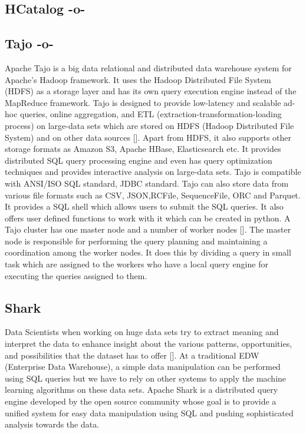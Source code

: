 \subsection{HCatalog -o-}



\subsection{Tajo -o-}

Apache Tajo is a big data relational and distributed data warehouse
system for Apache's Hadoop framework\cite{www-apache-tajo}. It uses
the Hadoop Distributed File System (HDFS) as a storage layer and has
its own query execution engine instead of the MapReduce
framework. Tajo is designed to provide low-latency and scalable ad-hoc
queries, online aggregation, and ETL
(extraction-transformation-loading process) on large-data sets which
are stored on HDFS (Hadoop Distributed File System) and on other data
sources [\cite{www-tutorialspoint-tajo}]. Apart from HDFS, it also
supports other storage formats as Amazon S3, Apache HBase,
Elasticsearch etc. It provides distributed SQL query processing engine
and even has query optimization techniques and provides interactive
analysis on large-data sets. Tajo is compatible with ANSI/ISO SQL
standard, JDBC standard. Tajo can also store data from various file
formats such as CSV, JSON,RCFile, SequenceFile, ORC and Parquet. It
provides a SQL shell which allows users to submit the SQL queries. It
also offers user defined functions to work with it which can be
created in python. A Tajo cluster has one master node and a number of
worker nodes [\cite{www-tutorialspoint-tajo}]. The master node is
responsible for performing the query planning and maintaining a
coordination among the worker nodes. It does this by dividing a query
in small task which are assigned to the workers who have a local query
engine for executing the queries assigned to them.


     

\subsection{Shark}

Data Scientists when working on huge data sets try to extract meaning
and interpret the data to enhance insight about the various patterns,
opportunities, and possibilities that the dataset has to
offer [\cite{shark-paper-2012}]. At a traditional EDW (Enterprise Data
Warehouse), a simple data manipulation can be performed using SQL
queries but we have to rely on other systems to apply the machine
learning algorithms on these data sets. Apache Shark is a distributed
query engine developed by the open source community whose goal is to
provide a unified system for easy data manipulation using SQL and
pushing sophisticated analysis towards the data.


